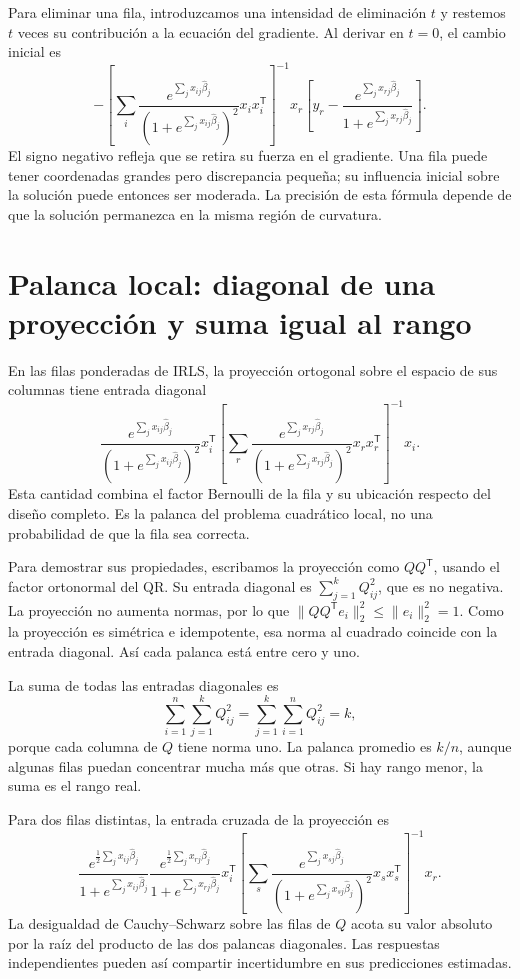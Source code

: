 \documentclass[11pt,a4paper]{article}
\newcommand{\T}{^{\mathsf T}}
\begin{document}
Para eliminar una fila, introduzcamos una intensidad
de eliminación \(t\) y restemos \(t\) veces su contribución
a la ecuación del gradiente.
Al derivar en \(t=0\), el cambio inicial es
\[
-\left[
\sum_i\frac{e^{\sum_jx_{ij}\widehat\beta_j}}
{(1+e^{\sum_jx_{ij}\widehat\beta_j})^2}x_ix_i\T
\right]^{-1}x_r
\left[y_r-\frac{e^{\sum_jx_{rj}\widehat\beta_j}}
{1+e^{\sum_jx_{rj}\widehat\beta_j}}\right].
\]
El signo negativo refleja que se retira su fuerza en el gradiente.
Una fila puede tener coordenadas grandes pero discrepancia
pequeña; su influencia inicial sobre la solución puede
entonces ser moderada.
La precisión de esta fórmula depende de que la solución
permanezca en la misma región de curvatura.

\clearpage
\section{Palanca local: diagonal de una proyección y suma igual al rango}\label{logit78}
En las filas ponderadas de IRLS, la proyección ortogonal
sobre el espacio de sus columnas tiene entrada diagonal
\[
\frac{e^{\sum_jx_{ij}\widehat\beta_j}}
{(1+e^{\sum_jx_{ij}\widehat\beta_j})^2}
x_i\T\left[
\sum_r\frac{e^{\sum_jx_{rj}\widehat\beta_j}}
{(1+e^{\sum_jx_{rj}\widehat\beta_j})^2}x_rx_r\T
\right]^{-1}x_i.
\]
Esta cantidad combina el factor Bernoulli de la fila
y su ubicación respecto del diseño completo.
Es la palanca del problema cuadrático local,
no una probabilidad de que la fila sea correcta.

Para demostrar sus propiedades, escribamos la proyección
como \(QQ\T\), usando el factor ortonormal del QR.
Su entrada diagonal es
\(\sum_{j=1}^k Q_{ij}^2\), que es no negativa.
La proyección no aumenta normas, por lo que
\(\|QQ\T e_i\|_2^2\le\|e_i\|_2^2=1\).
Como la proyección es simétrica e idempotente,
esa norma al cuadrado coincide con la entrada diagonal.
Así cada palanca está entre cero y uno.

La suma de todas las entradas diagonales es
\[
\sum_{i=1}^n\sum_{j=1}^k Q_{ij}^2
=\sum_{j=1}^k\sum_{i=1}^n Q_{ij}^2=k,
\]
porque cada columna de \(Q\) tiene norma uno.
La palanca promedio es \(k/n\), aunque algunas filas
puedan concentrar mucha más que otras.
Si hay rango menor, la suma es el rango real.

Para dos filas distintas, la entrada cruzada de la proyección es
\[
\frac{e^{\frac12\sum_jx_{ij}\widehat\beta_j}}
{1+e^{\sum_jx_{ij}\widehat\beta_j}}
\frac{e^{\frac12\sum_jx_{rj}\widehat\beta_j}}
{1+e^{\sum_jx_{rj}\widehat\beta_j}}
x_i\T\left[
\sum_s\frac{e^{\sum_jx_{sj}\widehat\beta_j}}
{(1+e^{\sum_jx_{sj}\widehat\beta_j})^2}x_sx_s\T
\right]^{-1}x_r.
\]
La desigualdad de Cauchy--Schwarz sobre las filas de \(Q\)
acota su valor absoluto por la raíz del producto
de las dos palancas diagonales.
Las respuestas independientes pueden así compartir
incertidumbre en sus predicciones estimadas.
\end{document}
